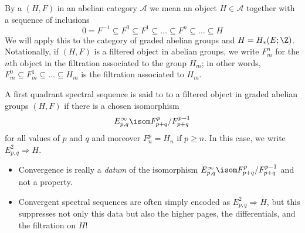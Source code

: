 \documentclass[wip, topology]{bsteffan-lecturenotes}
\begin{document}
By a  $(H, F)$ in an abelian category $\mathcal{A}$ we mean an object $H \in \mathcal{A}$ together with a sequence of inclusions
\begin{equation*}
	0 = F^{-1} \subseteq F^0 \subseteq F^1 \subseteq \ldots \subseteq F^n \subseteq \ldots \subseteq H
\end{equation*}
We will apply this to the category of graded abelian groups and $H = H_*(E; \Z)$.
Notationally, if $(H, F)$ is a filtered object in abelian groups, we write $F^n_m$ for the $n$th object in the filtration associated to the group $H_m$; in other words, $F^0_m \subseteq F^1_m \subseteq \ldots \subseteq H_m$ is the filtration associated to $H_m$.
\begin{definition}
	A first quadrant spectral sequence is said to  to a filtered object in graded abelian groups $(H, F)$ if there is a chosen isomorphism
	\begin{equation*}
		E^\infty_{p, q} \isom F^p_{p + q} / F^{p - 1}_{p + q}
	\end{equation*}
	for all values of $p$ and $q$ and moreover $F^p_n = H_n$ if $p \geq n$.
	In this case, we write $E^2_{p, q} \Rightarrow H$.
\end{definition}
\begin{remark}
	\leavevmode
	\begin{itemize}
		\item Convergence is really a \emph{datum} of the isomorphism $E^\infty_{p, q} \isom F^p_{p + q} / F^{p - 1}_{p + q}$ and not a property.
		\item Convergent spectral sequences are often simply encoded as $E^2_{p, q} \Rightarrow H$, but this suppresses not only this data but also the higher pages, the differentials, and the filtration on $H$!
	\end{itemize}
\end{remark}
\end{document}
